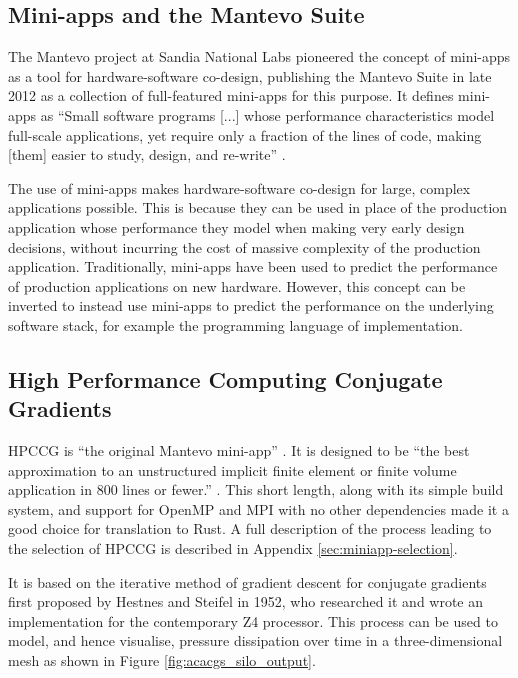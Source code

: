 \subsection{Mini-apps and the Mantevo Suite}
\label{ssec:miniapps-mantevo}

The Mantevo project at Sandia National Labs pioneered the concept of \acrshort{mini-app}s as a tool for hardware-software co-design, publishing the Mantevo Suite in late 2012 as a collection of full-featured \acrshort{mini-app}s for this purpose. It defines \acrshort{mini-app}s as ``Small software programs [...] whose performance characteristics model full-scale applications, yet require only a fraction of the lines of code, making [them] easier to study, design, and re-write'' \cite{heroux2013mantevo}.

The use of \acrshort{mini-app}s makes hardware-software co-design for large, complex applications possible. This is because they can be used in place of the production application whose performance they model when making very early design decisions, without incurring the cost of massive complexity of the production application. Traditionally, \acrshort{mini-app}s have been used to predict the performance of production applications on new hardware. However, this concept can be inverted to instead use \acrshort{mini-app}s to predict the performance on the underlying software stack, for example the programming language of implementation.

\subsection{High Performance Computing Conjugate Gradients}
\label{ssec:hpccg}

\acrfull{HPCCG} is ``the original Mantevo mini-app'' \cite{herouxHPCCGSolverPackage2007}. It is designed to be ``the best approximation to an unstructured implicit finite element or finite volume application in 800 lines or fewer.'' \cite{PackagesMantevo}. This short length, along with its simple build system, and support for OpenMP and MPI with no other dependencies made it a good choice for translation to Rust. A full description of the process leading to the selection of \acrshort{HPCCG} is described in Appendix \ref{sec:miniapp-selection}.

It is based on the iterative method of gradient descent for conjugate gradients first proposed by Hestnes and Steifel in 1952\cite{hestenesMethodsConjugateGradients1952}, who researched it and wrote an implementation for the contemporary Z4 processor. This process can be used to model, and hence visualise, pressure dissipation over time in a three-dimensional mesh as shown in Figure \ref{fig:acacgs_silo_output}.

